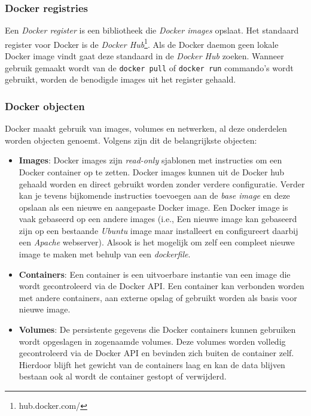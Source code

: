 \subsubsection{Docker registries} \label{registry}
Een \textit{Docker register} is een bibliotheek die \textit{Docker images} opslaat. Het standaard register voor Docker is de \textit{Docker Hub}\footnote{hub.docker.com/}. Als de Docker daemon geen lokale Docker image vindt gaat deze standaard in de \textit{Docker Hub} zoeken. Wanneer gebruik gemaakt wordt van de \verb|docker pull| of \verb|docker run| commando's wordt gebruikt, worden de benodigde images uit het register gehaald.

\subsubsection{Docker objecten} \label{dockerObjects}
Docker maakt gebruik van images, volumes en netwerken, al deze onderdelen worden objecten genoemt. Volgens \textcite{Docker2021a} zijn dit de belangrijkste objecten:

\begin{itemize}
        \item \textbf{Images}: Docker images zijn \textit{read-only} sjablonen met instructies om een Docker container op te zetten. Docker images kunnen uit de Docker hub gehaald worden en direct gebruikt worden zonder verdere configuratie. Verder kan je tevens bijkomende instructies toevoegen aan de \textit{base image} en deze opslaan als een nieuwe en aangepaste Docker image. Een Docker image is vaak gebaseerd op een andere images (i.e., Een nieuwe image kan gebaseerd zijn op een bestaande \textit{Ubuntu} image maar installeert en configureert daarbij een \textit{Apache} webserver). Alsook is het mogelijk om zelf een compleet nieuwe image te maken met behulp van een \textit{dockerfile}.
        \item \textbf{Containers}: Een container is een uitvoerbare instantie van een image die wordt gecontroleerd via de Docker API. Een container kan verbonden worden met andere containers, aan externe opslag of gebruikt worden als basis voor nieuwe image.
        \item \textbf{Volumes}: De persistente gegevens die Docker containers kunnen gebruiken wordt opgeslagen in zogenaamde volumes. Deze volumes worden volledig gecontroleerd via de Docker API en bevinden zich buiten de container zelf. Hierdoor blijft het gewicht van de containers laag en kan de data blijven bestaan ook al wordt de container gestopt of verwijderd.
\end{itemize}

